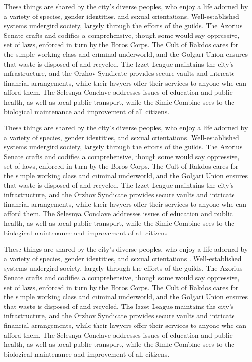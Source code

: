These things are shared by the city's diverse peoples, who enjoy a life adorned
by a variety of  species, gender identities, and sexual orientations.
Well-established systems undergird society, largely through the efforts of the
guilds. The Azorius Senate crafts and codifies a comprehensive, though some
would say oppressive, set of laws, enforced in turn by the Boros Corps. The Cult
of Rakdos cares for the simple working class and criminal underworld, and the
Golgari Union ensures that waste is disposed of and recycled. The Izzet League
maintains the city's infrastructure, and the Orzhov Syndicate provides secure
vaults and intricate financial arrangements, while their lawyers offer their
services to anyone who can afford them. The Selesnya Conclave addresses issues
of education and public health, as well as local public transport, while the
Simic Combine sees to the biological maintenance and improvement of all
citizens.

These things are shared by the city's diverse peoples, who enjoy a life adorned
by a variety of  species, gender identities, and sexual orientations.
Well-established systems undergird society, largely through the efforts of the
guilds. The Azorius Senate crafts and codifies a comprehensive, though some
would say oppressive, set of laws, enforced in turn by the Boros Corps. The Cult
of Rakdos cares for the simple working class and criminal underworld, and the
Golgari Union ensures that waste is disposed of and recycled. The Izzet League
maintains the city's infrastructure, and the Orzhov Syndicate provides secure
vaults and intricate financial arrangements, while their lawyers offer their
services to anyone who can afford them. The Selesnya Conclave addresses issues
of education and public health, as well as local public transport, while the
Simic Combine sees to the biological maintenance and improvement of all
citizens.

These things are shared by the city's diverse peoples, who enjoy a life adorned
by a variety of  species, gender identities, and sexual orientations
\citep{Trapnell2010, Scholz2003, Schweitzer2011}. Well-established systems undergird society, largely
through the efforts of the guilds. The Azorius Senate crafts and codifies a
comprehensive, though some would say oppressive, set of laws, enforced in turn
by the Boros Corps. The Cult of Rakdos cares for the simple working class and
criminal underworld, and the Golgari Union ensures that waste is disposed of and
recycled. The Izzet League maintains the city's infrastructure, and the Orzhov
Syndicate provides secure vaults and intricate financial arrangements, while
their lawyers offer their services to anyone who can afford them. The Selesnya
Conclave addresses issues of education and public health, as well as local
public transport, while the Simic Combine sees to the biological maintenance and
improvement of all citizens.

